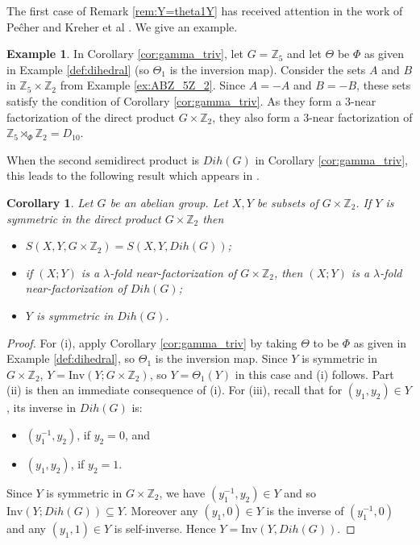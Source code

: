 \documentclass[12pt, a4paper]{article}
\newtheorem{corollary}[theorem]{Corollary}
\theoremstyle{definition}
\newtheorem{example}[theorem]{Example}
\begin{document}
The first case of Remark \ref{rem:Y=theta1Y} has received attention in the work of Pe\^{c}her \cite{Pec} and Kreher et al \cite{KrePatSti}.  We give an example.
\begin{example}\label{ex:RunNear}
In Corollary \ref{cor:gamma_triv}, let $G=\mathbb{Z}_5$ and let $\Theta$ be $\Phi$ as given in Example \ref{def:dihedral} (so $\Theta_1$ is the inversion map).  Consider the sets $A$ and $B$ in $\mathbb{Z}_5 \times \mathbb{Z}_2$ from Example \ref{ex:ABZ_5Z_2}. Since $A=-A$ and $B=-B$, these sets satisfy the condition of Corollary \ref{cor:gamma_triv}.  As they form a $3$-near factorization of the direct product $G\times \mathbb{Z}_2$, they also form a $3$-near factorization of $\mathbb{Z}_5 \rtimes_\Phi \mathbb{Z}_2=D_{10}$.
\end{example}

When the second semidirect product is $Dih(G)$ in Corollary \ref{cor:gamma_triv}, this leads to the following result which appears in \cite{Pec}.

\begin{corollary}\label{cor:PecGen}
Let $G$ be an abelian group.  Let $X,Y$ be subsets of $G \times \mathbb{Z}_2$. 
If $Y$ is symmetric in the direct product $G \times \mathbb{Z}_2$ then
\begin{itemize}
\item[(i)] $S(X,Y,G \times \mathbb{Z}_2)=S(X,Y, Dih(G))$;
\item[(ii)] if $(X;Y)$ is a $\lambda$-fold near-factorization of $G \times \mathbb{Z}_2$, then $(X;Y)$ is a $\lambda$-fold near-factorization of $Dih(G)$;
\item[(iii)] $Y$ is symmetric in $Dih(G)$.
\end{itemize}
\end{corollary}
\begin{proof}
For (i), apply Corollary \ref{cor:gamma_triv} by taking $\Theta$ to be $\Phi$ as given in Example \ref{def:dihedral}, so $\Theta_1$ is the inversion map.  Since $Y$ is symmetric in $G \times \mathbb{Z}_2$, $Y=\mathrm{Inv}(Y; G \times \mathbb{Z}_2)$, so $Y=\Theta_1(Y)$ in this case and (i) follows. Part (ii) is then an immediate consequence of (i). For (iii), recall that for $(y_1,y_2)\in Y$, its inverse in $Dih(G)$ is:
    \begin{itemize}
        \item $(y_1^{-1},y_2)$, if $y_2=0$, and 
        \item $(y_1,y_2)$, if $y_2=1$.
    \end{itemize}
Since $Y$ is symmetric in $G \times \mathbb{Z}_2$, we have $(y_1^{-1},y_2) \in Y$ and so $\mathrm{Inv}(Y; Dih(G)) \subseteq Y$.  Moreover any $(y_1,0) \in Y$ is the inverse of $(y_1^{-1},0)$ and any $(y_1,1) \in Y$ is self-inverse. Hence $Y=\mathrm{Inv}(Y,Dih(G))$.
\end{proof}
\end{document}
